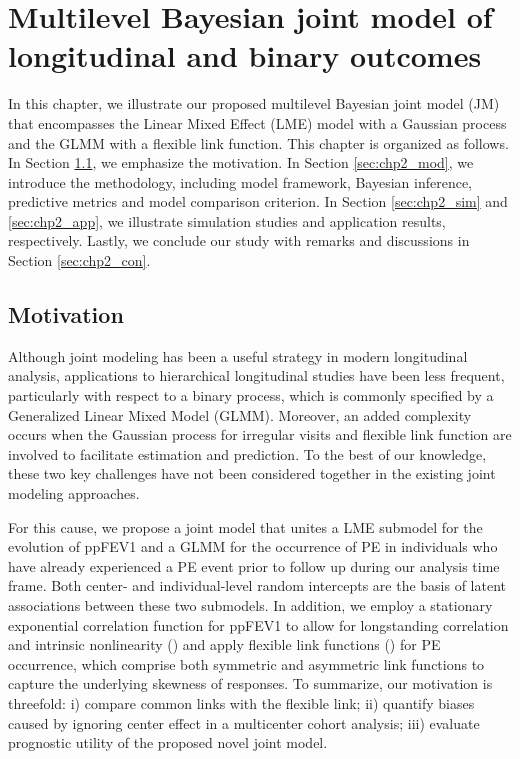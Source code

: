 \chapter{Multilevel Bayesian joint model of longitudinal and binary outcomes}\label{chp2}

In this chapter, we illustrate our proposed multilevel Bayesian joint model (JM) that encompasses the Linear Mixed Effect (LME) model with a Gaussian process and the GLMM with a flexible link function. This chapter is organized as follows. In Section \ref{sec:chp2_mov}, we emphasize the motivation. In Section \ref{sec:chp2_mod}, we introduce the methodology, including model framework, Bayesian inference, predictive metrics and model comparison criterion. In Section \ref{sec:chp2_sim} and \ref{sec:chp2_app}, we illustrate simulation studies and application results, respectively. Lastly, we conclude our study with remarks and discussions in Section \ref{sec:chp2_con}. 

\section{Motivation} \label{sec:chp2_mov}

Although joint modeling has been a useful strategy in modern longitudinal analysis, applications to hierarchical longitudinal studies have been less frequent, particularly with respect to a binary process, which is commonly specified by a Generalized Linear Mixed Model (GLMM). Moreover, an added complexity occurs when the Gaussian process for irregular visits and flexible link function are involved to facilitate estimation and prediction. To the best of our knowledge, these two key challenges have not been considered together in the existing joint modeling approaches. 

For this cause, we propose a joint model that unites a LME submodel for the evolution of ppFEV1 and a GLMM for the occurrence of PE in individuals who have already experienced a PE event prior to follow up during our analysis time frame. Both center- and individual-level random intercepts are the basis of latent associations between these two submodels. In addition, we employ a stationary exponential correlation function for ppFEV1 to allow for longstanding correlation and intrinsic nonlinearity (\cite{Szczesniak2017}) and apply flexible link functions (\cite{Jiang2013}) for PE occurrence, which comprise both symmetric and asymmetric link functions to capture the underlying skewness of responses. To summarize, our motivation is threefold: i) compare common links with the flexible link; ii) quantify biases caused by ignoring center effect in a multicenter cohort analysis; iii) evaluate prognostic utility of the proposed novel joint model. 


